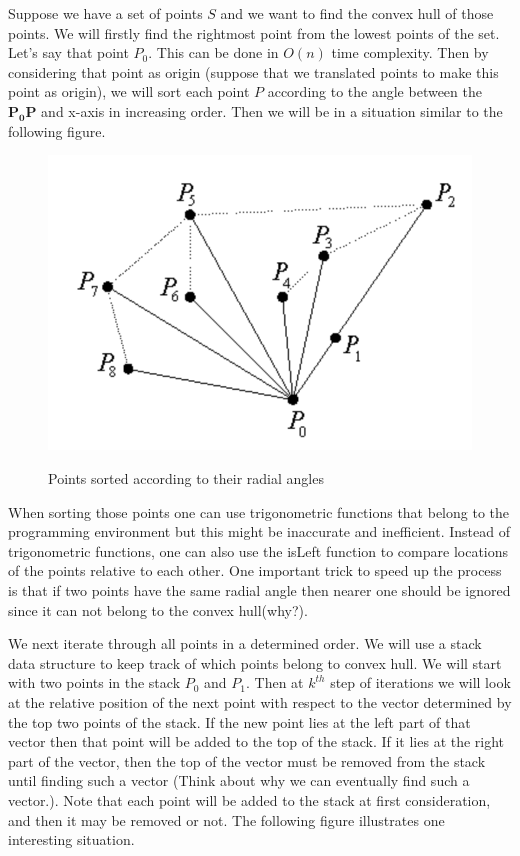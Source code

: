 \documentclass[12pt]{article}
\begin{document}
Suppose we have a set of points $S$ and we want to find the convex hull of those
points. We will firstly find the rightmost point from the lowest points of the set.
Let's say that point $P_0$.
This can be done in $O(n)$ time complexity. Then by considering that point as origin
(suppose that we translated points to make this point as origin), we will sort
each point $P$ according to the angle between the $\pmb{P_0P}$ and x-axis in 
increasing order. Then we will be in a situation similar to the following figure.

\begin{center}
  \begin{figure}[!htb]
    \centering
    \includegraphics[width=.45\linewidth]{figures/fig14.png}
    \label{fig:15}
    \caption{Points sorted according to their radial angles}
  \end{figure}
\end{center}

When sorting those points one can use trigonometric functions that belong to the programming
environment but this might be inaccurate and inefficient. Instead of trigonometric
functions, one can also use the isLeft function to compare locations of the points
relative to each other. One important trick to speed up the process is that if two points have the same radial angle then nearer one should be ignored since it can not belong to the 
convex hull(why?).

We next iterate through all points in a determined order. We will use a stack data structure
to keep track of which points belong to convex hull. We will start with two points
in the stack $P_0$ and $P_1$. Then at $k^{th}$ step of iterations we will look 
at the relative position of the next point with respect to the vector determined by the top two points of the stack. If the new point lies at the left part of that vector
then that point will be added to the top of the stack. If it lies at the right part of the
vector, then the top of the vector must be removed from the stack until finding such a vector
(Think about why we can eventually find such a vector.). Note that each point 
will be added to the stack at first consideration, and then it may be removed or not.
The following figure illustrates one interesting situation.
\end{document}
